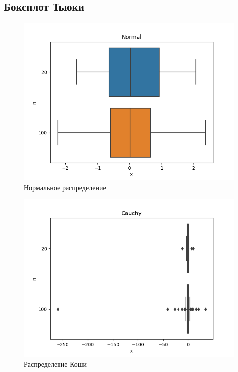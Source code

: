 \documentclass[12pt]{article}
\begin{document}
\FloatBarrier
\subsection{Боксплот Тьюки}
\begin{figure}[ht]
  \centering
  \includegraphics[width=0.4\paperwidth ]{images/boxplots/Normal.png}
  \caption{Нормальное распределение}
\end{figure}

\begin{figure}[ht]
  \centering
  \includegraphics[width=0.4\paperwidth ]{images/boxplots/Cauchy.png}
  \caption{Распределение Коши}
\end{figure}
\end{document}
